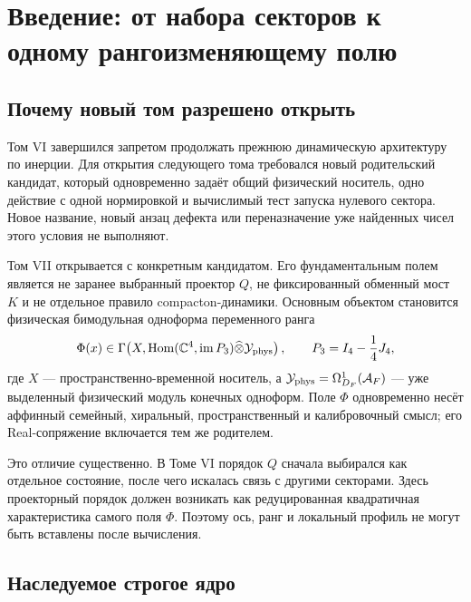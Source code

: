 \chapter{Введение: от набора секторов к одному рангоизменяющему полю}

\section{Почему новый том разрешено открыть}

Том VI завершился запретом продолжать прежнюю динамическую архитектуру по
инерции. Для открытия следующего тома требовался новый родительский кандидат,
который одновременно задаёт общий физический носитель, одно действие с одной
нормировкой и вычислимый тест запуска нулевого сектора. Новое название, новый
анзац дефекта или переназначение уже найденных чисел этого условия не
выполняют.

Том VII открывается с конкретным кандидатом. Его фундаментальным полем
является не заранее выбранный проектор $Q$, не фиксированный обменный мост
$K$ и не отдельное правило compacton-динамики. Основным объектом становится
физическая бимодульная одноформа переменного ранга
\begin{equation}
 \Phi(x)\in
 \Gamma\!\left(
 X,
 \operatorname{Hom}(\mathbb C^4,\operatorname{im}P_3)
 \widehat\otimes
 \mathcal Y_{\rm phys}
 \right),
 \qquad
 P_3=I_4-\frac14J_4,
 \label{eq:v7-fundamental-rank-field}
\end{equation}
где $X$ --- пространственно-временной носитель, а
$\mathcal Y_{\rm phys}=\Omega^1_{D_F}(\mathcal A_F)$ --- уже выделенный
физический модуль конечных одноформ. Поле $\Phi$ одновременно несёт
аффинный семейный, хиральный, пространственный и калибровочный смысл; его
Real-сопряжение включается тем же родителем.

Это отличие существенно. В Томе VI порядок $Q$ сначала выбирался как
отдельное состояние, после чего искалась связь с другими секторами. Здесь
проекторный порядок должен возникать как редуцированная квадратичная
характеристика самого поля $\Phi$. Поэтому ось, ранг и локальный профиль не
могут быть вставлены после вычисления.

\section{Наследуемое строгое ядро}

